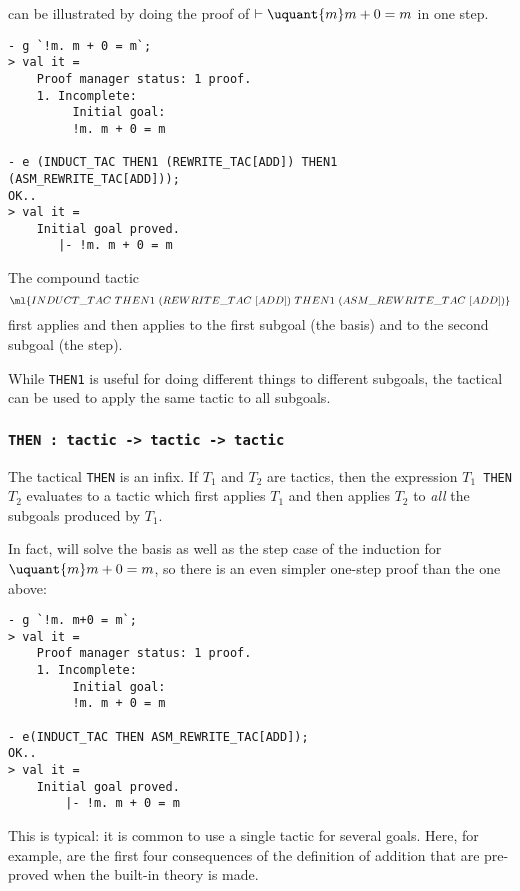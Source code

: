  can be illustrated by doing the proof of $\vdash \uquant{m}m+0=m$ in
one step.

\setcounter{sessioncount}{0}
\begin{session}
\begin{verbatim}
- g `!m. m + 0 = m`;
> val it =
    Proof manager status: 1 proof.
    1. Incomplete:
         Initial goal:
         !m. m + 0 = m

- e (INDUCT_TAC THEN1 (REWRITE_TAC[ADD]) THEN1 (ASM_REWRITE_TAC[ADD]));
OK..
> val it =
    Initial goal proved.
       |- !m. m + 0 = m
\end{verbatim}
\end{session}

\noindent The compound tactic \[
\ml{INDUCT\_TAC~THEN1~(REWRITE\_TAC~[ADD])~THEN1~(ASM\_REWRITE\_TAC~[ADD])}
\]
first applies  and then applies  to the first subgoal (the basis) and  to the second subgoal (the step).

While {\small\verb|THEN1|} is useful for doing different things
to different subgoals, the tactical  can be used to apply the
same tactic to all subgoals.

\subsubsection{\tt THEN : tactic -> tactic -> tactic}\label{THEN}

The tactical {\small\verb|THEN|} is an \ML{} infix. If $T_1$ and $T_2$
are tactics, then the \ML{} expression $T_1${\small\verb| THEN |}$T_2$
evaluates to a tactic which first applies $T_1$ and then applies $T_2$
to \emph{all} the subgoals produced by $T_1$.

In fact,  will solve the basis as well as
the step case of the induction for $\uquant{m}m+0=m$, so there is an
even simpler one-step proof than the one above:
\setcounter{sessioncount}{0}
\begin{session}
\begin{verbatim}
- g `!m. m+0 = m`;
> val it =
    Proof manager status: 1 proof.
    1. Incomplete:
         Initial goal:
         !m. m + 0 = m

- e(INDUCT_TAC THEN ASM_REWRITE_TAC[ADD]);
OK..
> val it =
    Initial goal proved.
        |- !m. m + 0 = m
\end{verbatim}
\end{session}

\noindent This is typical: it is common to use a single tactic for several
goals. Here, for example, are the first four consequences of the
definition  of addition that are pre-proved when the built-in
theory  \HOL{} is made.

